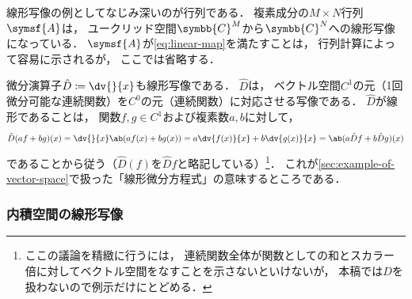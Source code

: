 \documentclass[
]{sotsu}
\begin{document}
線形写像の例としてなじみ深いのが行列である．
複素成分の$M \times N$行列$\symsf{A}$は，
ユークリッド空間$\symbb{C}^M$から$\symbb{C}^N$への線形写像になっている．
$\symsf{A}$が\cref{eq:linear-map}を満たすことは，
行列計算によって容易に示されるが，
ここでは省略する．

微分演算子$\hat{D} \coloneq \dv{}{x}$も線形写像である．
$\hat{D}$は，
ベクトル空間$C^1$の元（1回微分可能な連続関数）を$C^0$の元（連続関数）に対応させる写像である．
$\hat{D}$が線形であることは，
関数$f, g \in C^1$および複素数$a, b$に対して，
\begin{equation*}
    \hat{D}(af + bg)(x) = \dv{}{x} \ab(a f(x) + b g(x))
        = a \dv{f(x)}{x} + b \dv{g(x)}{x}
        = \ab( a \hat{D}f + b \hat{D}g )(x)
\end{equation*}
であることから従う（$\hat{D}(f)$を$\hat{D}f$と略記している）\footnote{
    ここの議論を精緻に行うには，
    連続関数全体が関数としての和とスカラー倍に対してベクトル空間をなすことを示さないといけないが，
    本稿では$\hat{D}$を扱わないので例示だけにとどめる．
}．
これが\cref{sec:example-of-vector-space}で扱った「線形微分方程式」の意味するところである．



\subsubsection{内積空間の線形写像}
\end{document}
